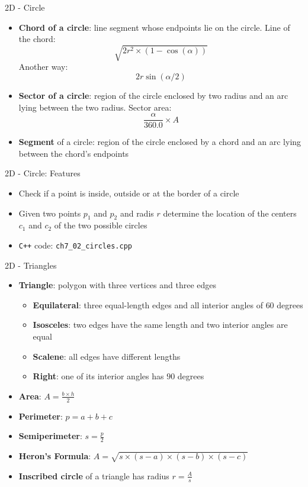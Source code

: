 \documentclass{beamer}
\begin{document}
\begin{frame}{2D - Circle}
    \begin{itemize}
        \item \textbf{Chord of a circle}: line segment whose endpoints lie on the circle. Line of the chord: $$\sqrt{2r^2\times (1- \cos(\alpha))}$$ Another way: $$2r\sin(\alpha/2)$$
        \item \textbf{Sector of a circle}: region of the circle enclosed by two radius and an arc lying between the two radius. Sector area: $$\frac{\alpha}{360.0}\times A$$
        \item \textbf{Segment} of a circle: region of the circle enclosed by a chord and an arc lying between the chord's endpoints
    \end{itemize}
\end{frame}

\begin{frame}[fragile]{2D - Circle: Features}
    \begin{itemize}
        \item Check if a point is inside, outside or at the border of a circle
        \item Given two points $p_1$ and $p_2$ and radis $r$ determine the location of the centers $c_1$ and $c_2$ of the two possible circles
        \item \color{red} \verb|C++| code: \verb|ch7_02_circles.cpp| \color{black}
    \end{itemize}
\end{frame}

\begin{frame}{2D - Triangles}
    \begin{itemize}
        \item \textbf{Triangle}: polygon with three vertices and three edges
            \begin{itemize}
                \item \textbf{Equilateral}: three equal-length edges and all interior angles of $60$ degrees
                \item \textbf{Isosceles}: two edges have the same length and two interior angles are equal
                \item \textbf{Scalene}: all edges have different lengths
                \item \textbf{Right}: one of its interior angles has $90$ degrees
            \end{itemize}
        \item \textbf{Area}: $A = \frac{b\times h}{2}$
        \item \textbf{Perimeter}: $p = a + b + c$
        \item \textbf{Semiperimeter}: $s = \frac{p}{2}$
        \item \textbf{Heron's Formula}: $A = \sqrt{s\times (s-a)\times (s-b) \times (s-c)}$
        \item \textbf{Inscribed circle} of a triangle has radius $r=\frac{A}{s}$
    \end{itemize}
\end{frame}
\end{document}
